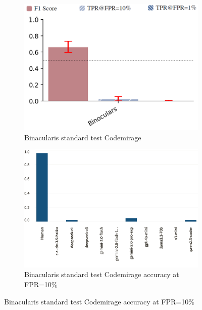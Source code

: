 \begin{figure}[H]
    \begin{subfigure}[b]{0.4\textwidth}
        \centering
        \includegraphics[width=\linewidth]{img/TEST/Binacularis_standard/UncoveringTest.png}
        \caption{Binacularis standard test Codemirage}
        \label{fig:4}
    \end{subfigure}
    \hfill
    \begin{subfigure}[t]{0.4\textwidth}
        \centering
        \includegraphics[width=\linewidth]{img/TEST/Binacularis_standard/visualization(13)d.png}
        \caption{Binacularis standard test Codemirage accuracy at FPR=10\%}
        \label{fig:b4}
    \end{subfigure}
\end{figure}



